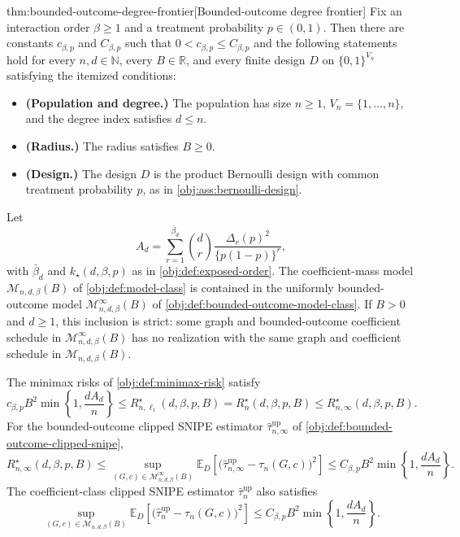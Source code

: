 \begin{theoremv}{thm:bounded-outcome-degree-frontier}[Bounded-outcome degree frontier]
Fix an interaction order \(\beta\ge 1\) and a treatment probability \(p\in(0,1)\).  Then there are constants \(c_{\beta,p}\) and \(C_{\beta,p}\) such that \(0<c_{\beta,p}\le C_{\beta,p}\) and the following statements hold for every \(n,d\in\mathbb N\), every \(B\in\mathbb R\), and every finite design \(D\) on \(\{0,1\}^{V_n}\) satisfying the itemized conditions:
\begin{itemize}
\item \textbf{(Population and degree.)} The population has size \(n\ge1\), \(V_n=\{1,\ldots,n\}\), and the degree index satisfies \(d\le n\).
\item \textbf{(Radius.)} The radius satisfies \(B\ge0\).
\item \textbf{(Design.)} The design \(D\) is the product Bernoulli design with common treatment probability \(p\), as in \cref{obj:ass:bernoulli-design}.
\end{itemize}
Let
\[
A_d
=
\sum_{r=1}^{\bar\beta_d}
\binom{d}{r}
\frac{\Delta_r(p)^2}{\{p(1-p)\}^r},
\]
with \(\bar\beta_d\) and \(k_\star(d,\beta,p)\) as in \cref{obj:def:exposed-order}.  The coefficient-mass model \(\mathcal M_{n,d,\beta}(B)\) of \cref{obj:def:model-class} is contained in the uniformly bounded-outcome model \(\mathcal M_{n,d,\beta}^{\infty}(B)\) of \cref{obj:def:bounded-outcome-model-class}.  If \(B>0\) and \(d\ge1\), this inclusion is strict: some graph and bounded-outcome coefficient schedule in \(\mathcal M_{n,d,\beta}^{\infty}(B)\) has no realization with the same graph and coefficient schedule in \(\mathcal M_{n,d,\beta}(B)\).

The minimax risks of \cref{obj:def:minimax-risk} satisfy
\[
c_{\beta,p} B^2
\min\!\left\{1,\frac{dA_d}{n}\right\}
\le
R_{n,\ell_1}^{\star}(d,\beta,p,B)
=
R_n^{\star}(d,\beta,p,B)
\le
R_{n,\infty}^{\star}(d,\beta,p,B).
\]
For the bounded-outcome clipped SNIPE estimator \(\widehat\tau_{n,\infty}^{\mathrm{up}}\) of \cref{obj:def:bounded-outcome-clipped-snipe},
\[
R_{n,\infty}^{\star}(d,\beta,p,B)
\le
\sup_{(G,c)\in\mathcal M_{n,d,\beta}^{\infty}(B)}
\mathbb E_D\!\left[
\bigl(\widehat\tau_{n,\infty}^{\mathrm{up}}-\tau_n(G,c)\bigr)^2
\right]
\le
C_{\beta,p} B^2
\min\!\left\{1,\frac{dA_d}{n}\right\}.
\]
The coefficient-class clipped SNIPE estimator \(\widehat\tau_n^{\mathrm{up}}\) also satisfies
\[
\sup_{(G,c)\in\mathcal M_{n,d,\beta}(B)}
\mathbb E_D\!\left[
\bigl(\widehat\tau_n^{\mathrm{up}}-\tau_n(G,c)\bigr)^2
\right]
\le
C_{\beta,p} B^2
\min\!\left\{1,\frac{dA_d}{n}\right\}.
\]


\end{theoremv}
